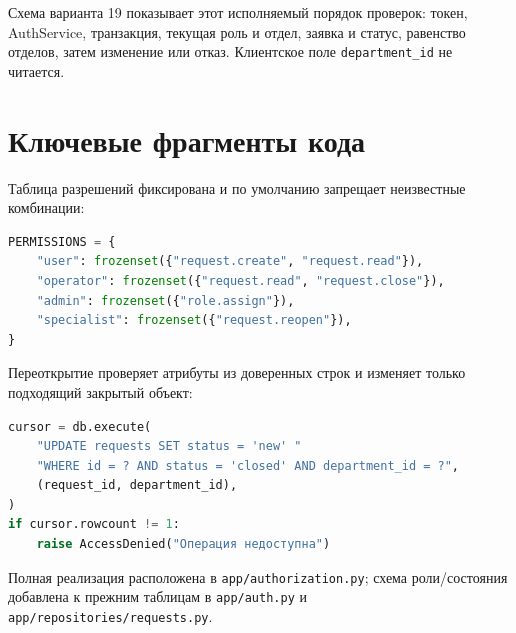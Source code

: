 \documentclass[12pt,a4paper]{article}
\begin{document}
Схема варианта 19 показывает этот исполняемый порядок проверок: токен, AuthService, транзакция, текущая роль и отдел, заявка и статус, равенство отделов, затем изменение или отказ. Клиентское поле \texttt{department\_id} не читается.

\section{Ключевые фрагменты кода}
Таблица разрешений фиксирована и по умолчанию запрещает неизвестные комбинации:
\begin{lstlisting}[language=Python]
PERMISSIONS = {
    "user": frozenset({"request.create", "request.read"}),
    "operator": frozenset({"request.read", "request.close"}),
    "admin": frozenset({"role.assign"}),
    "specialist": frozenset({"request.reopen"}),
}
\end{lstlisting}

Переоткрытие проверяет атрибуты из доверенных строк и изменяет только подходящий закрытый объект:
\begin{lstlisting}[language=Python]
cursor = db.execute(
    "UPDATE requests SET status = 'new' "
    "WHERE id = ? AND status = 'closed' AND department_id = ?",
    (request_id, department_id),
)
if cursor.rowcount != 1:
    raise AccessDenied("Операция недоступна")
\end{lstlisting}
Полная реализация расположена в \texttt{app/authorization.py}; схема роли/состояния добавлена к прежним таблицам в \texttt{app/auth.py} и \texttt{app/repositories/requests.py}.
\end{document}
